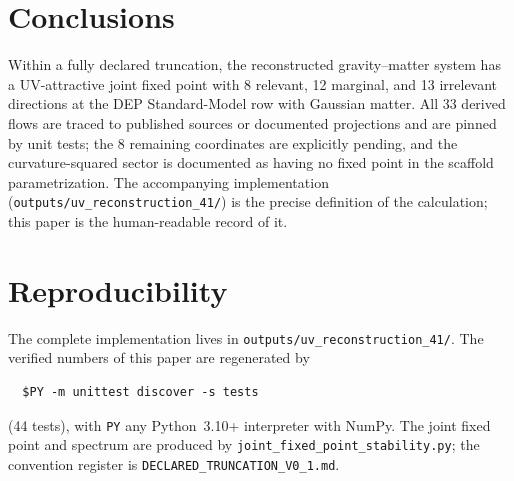 \documentclass[11pt]{article}
\begin{document}
\section{Conclusions}
\label{sec:conclusions}

Within a fully declared truncation, the reconstructed gravity--matter system
has a UV-attractive joint fixed point with 8 relevant, 12 marginal, and 13
irrelevant directions at the DEP Standard-Model row with Gaussian matter.  All
33 derived flows are traced to published sources or documented projections and
are pinned by unit tests; the 8 remaining coordinates are explicitly pending,
and the curvature-squared sector is documented as having no fixed point in the
scaffold parametrization.  The accompanying implementation
(\texttt{outputs/uv\_reconstruction\_41/}) is the precise definition of the
calculation; this paper is the human-readable record of it.

\section*{Reproducibility}
\label{sec:repro}
The complete implementation lives in
\texttt{outputs/uv\_reconstruction\_41/}.  The verified numbers of this paper
are regenerated by
\begin{verbatim}
  $PY -m unittest discover -s tests
\end{verbatim}
(44 tests), with \texttt{PY} any Python~3.10+ interpreter with NumPy.
The joint fixed point and spectrum are produced by
\texttt{joint\_fixed\_point\_stability.py}; the convention register is
\texttt{DECLARED\_TRUNCATION\_V0\_1.md}.
\end{document}
